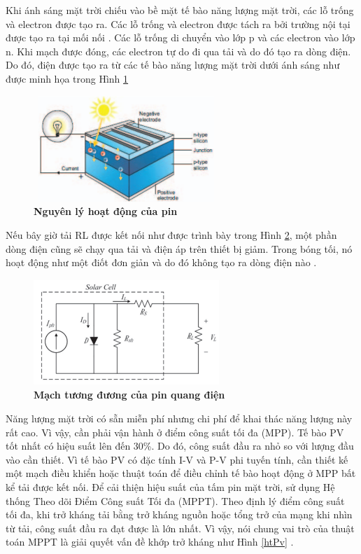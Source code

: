 \documentclass{article} %
\begin{document}
	Khi ánh sáng mặt trời chiếu vào bề mặt tế bào năng lượng mặt trời, các lỗ trống và electron được tạo ra. Các lỗ trống và electron được tách ra bởi trường nội tại được tạo ra tại mối nối \cite{batt2022design}. Các lỗ trống di chuyển vào lớp p và các electron vào lớp n. Khi mạch được đóng, các electron tự do đi qua tải và do đó tạo ra dòng điện. Do đó, điện được tạo ra từ các tế bào năng lượng mặt trời dưới ánh sáng như được minh họa trong Hình \ref{nltampin}
	
	\begin{figure}[!ht]
		\centering
		\includegraphics[width=7cm,height=4cm]{Images/nltampin.png}
		\caption[ Nguyên lý hoạt động của pin mặt trời \cite{batt2022design}]{\bfseries \fontsize{12pt}{0pt}\selectfont Nguyên lý hoạt động của pin \cite{batt2022design}}
		\label{nltampin}
	\end{figure}
	
	\newpage
	Nếu bây giờ tải RL được kết nối như được trình bày trong Hình \ref{quangdien}, một phần dòng điện cũng sẽ chạy qua tải và điện áp trên thiết bị giảm. Trong bóng tối, nó hoạt động như một điốt đơn giản và do đó không tạo ra dòng điện nào \cite{batt2022design}.
	
	\begin{figure}[!ht]
		\centering
		\includegraphics[width=7cm,height=4cm]{Images/quangdien.png}
		\caption[ Mạch tương đương của pin quang điện \cite{batt2022design}]{\bfseries \fontsize{12pt}{0pt}\selectfont Mạch tương đương của pin quang điện \cite{batt2022design} }
		\label{quangdien}
	\end{figure}
	
	Năng lượng mặt trời có sẵn miễn phí nhưng chi phí để khai thác năng lượng này rất cao. Vì vậy, cần phải vận hành ở điểm công suất tối đa (MPP). Tế bào PV tốt nhất có hiệu suất lên đến 30\%. Do đó, công suất đầu ra nhỏ so với lượng đầu vào cần thiết. Vì tế bào PV có đặc tính I-V và P-V phi tuyến tính, cần thiết kế một mạch điều khiển hoặc thuật toán để điều chỉnh tế bào hoạt động ở MPP bất kể tải được kết nối. Để cải thiện hiệu suất của tấm pin mặt trời, sử dụng Hệ thống Theo dõi Điểm Công suất Tối đa (MPPT). Theo định lý điểm công suất tối đa, khi trở kháng tải bằng trở kháng nguồn hoặc tổng trở của mạng khi nhìn từ tải, công suất đầu ra đạt được là lớn nhất. Vì vậy, nói chung vai trò của thuật toán MPPT là giải quyết vấn đề khớp trở kháng như Hình \ref{htPv} \cite{batt2022design}. 
	
\end{document}
